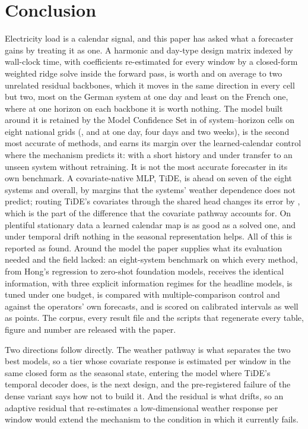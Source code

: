 \section{Conclusion}
\label{sec:conclusion}
Electricity load is a calendar signal, and this paper has asked what a forecaster gains by
treating it as one. A harmonic and day-type design matrix indexed by wall-clock time, with
coefficients re-estimated for every window by a closed-form weighted ridge solve inside the
forward pass, is worth  and
 on average to two unrelated residual backbones, which it moves in the same direction in every cell but two, most on the German system at one day and least on the French one, where at one horizon on each backbone it is
worth nothing. The model built
around it is retained by the Model Confidence Set in  of
 system--horizon cells on eight national grids
(,  and 
at one day, four days and two weeks), is the second most
accurate of  methods, and earns its margin over the learned-calendar control
where the mechanism predicts it: with a short history and under transfer to an unseen system
without retraining. It is not the most accurate forecaster in its own benchmark. A
covariate-native MLP, TiDE, is ahead on seven of the eight systems and overall, by margins that
the systems' weather dependence does not predict; routing TiDE's covariates through the shared
head changes its error by , which is the part of
the difference that the covariate pathway accounts for. On plentiful stationary data a learned
calendar map is as good as a solved one, and under temporal drift nothing in the seasonal
representation helps. All of this is reported as found. Around the model the paper supplies
what its evaluation needed and the field lacked: an eight-system benchmark on which every
method, from Hong's regression to zero-shot foundation models, receives the identical
information, with three explicit information regimes for the headline models, is tuned under
one budget, is compared with multiple-comparison control and against the operators' own
forecasts, and is scored on calibrated intervals as well as points. The corpus, every result
file and the scripts that regenerate every table, figure and number are released with the
paper.

Two directions follow directly. The weather pathway is what separates the two best models, so
a tier whose covariate response is estimated per window in the same closed form as the
seasonal state, entering the model where TiDE's temporal decoder does, is the next design, and
the pre-registered failure of the dense variant says how not to build it. And the residual is
what drifts, so an adaptive residual that re-estimates a low-dimensional weather response per
window would extend the mechanism to the condition in which it currently fails.
